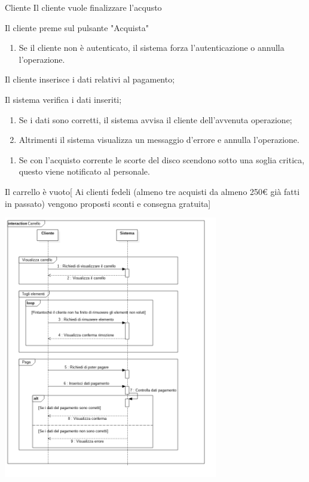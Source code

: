     {Cliente}
    {Il cliente vuole finalizzare l'acqusto}
    {   \item Il cliente preme sul pulsante "Acquista"
        \begin{enumerate}[label*=\arabic*.]
            \item Se il cliente non è autenticato, il sistema forza l'autenticazione o annulla l'operazione.
        \end{enumerate}
        \item Il cliente inserisce i dati relativi al pagamento;
        \item Il sistema verifica i dati inseriti;
        \begin{enumerate}[label*=\arabic*.]
            \item Se i dati sono corretti, il sistema avvisa il cliente dell'avvenuta operazione;
            \item Altrimenti il sistema visualizza un messaggio d'errore e annulla l'operazione.
        \end{enumerate}
        \begin{enumerate}[label*=\arabic*.]
            \item Se con l'acquisto corrente le scorte del disco scendono sotto una soglia critica, questo viene notificato al \gls{personale}.
        \end{enumerate}
    }
    {Il carrello è vuoto}[
    Ai clienti fedeli (almeno tre acquisti da almeno 250€ già fatti in passato) vengono proposti sconti e consegna gratuita]
    
\begin{center}
    \includegraphics[width=0.7\textwidth]{diagram/seq-uc4-uc5-uc6.png}
\end{center}
    
